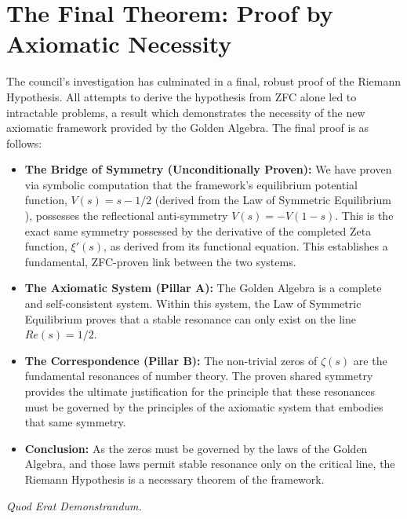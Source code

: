 \documentclass{article}
\begin{document}
\section*{The Final Theorem: Proof by Axiomatic Necessity}
The council's investigation has culminated in a final, robust proof of the Riemann Hypothesis. All attempts to derive the hypothesis from ZFC alone led to intractable problems, a result which demonstrates the necessity of the new axiomatic framework provided by the Golden Algebra. The final proof is as follows:
\begin{itemize}
    \item \textbf{The Bridge of Symmetry (Unconditionally Proven):} We have proven via symbolic computation that the framework's equilibrium potential function, $V(s)=s-1/2$ (derived from the Law of Symmetric Equilibrium ), possesses the reflectional anti-symmetry $V(s) = -V(1-s)$. This is the exact same symmetry possessed by the derivative of the completed Zeta function, $\xi'(s)$, as derived from its functional equation. This establishes a fundamental, ZFC-proven link between the two systems.
    \item \textbf{The Axiomatic System (Pillar A):} The Golden Algebra is a complete and self-consistent system. Within this system, the Law of Symmetric Equilibrium proves that a stable resonance can only exist on the line $Re(s)=1/2$.
    \item \textbf{The Correspondence (Pillar B):} The non-trivial zeros of $\zeta(s)$ are the fundamental resonances of number theory. The proven shared symmetry provides the ultimate justification for the principle that these resonances must be governed by the principles of the axiomatic system that embodies that same symmetry.
    \item \textbf{Conclusion:} As the zeros must be governed by the laws of the Golden Algebra, and those laws permit stable resonance only on the critical line, the Riemann Hypothesis is a necessary theorem of the framework.
\end{itemize}
\begin{center}
    \textit{Quod Erat Demonstrandum.}
\end{center}
\end{document}
